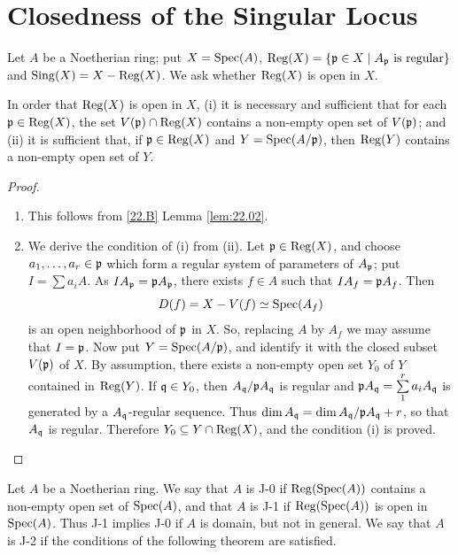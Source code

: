 \documentclass[../main]{subfiles}
\begin{document}
\section{Closedness of the Singular Locus}\label{sec:32}

\newparagraph Let $A$ be a Noetherian ring; put $X = \operatorname{Spec}(A)$, $\operatorname{Reg}(X) = \{\mathfrak{p} \in X \mid A_{\mathfrak{p}} \text { is regular}\}$ and $\operatorname{Sing}(X) = X - \operatorname{Reg}(X)$. We ask whether $\operatorname{Reg}(X)$ is open in $X$. 

\begin{lemma}
\label{lem:32.1}
In order that $\operatorname{Reg}(X)$ is open in $X$, (i) it is necessary and sufficient that for each $\mathfrak{p} \in \operatorname{Reg}(X)$, the set $V(\mathfrak{p}) \cap \operatorname{Reg}(X)$ contains a non-empty open set of $V(\mathfrak{p})$; and (ii) it is sufficient that, if $\mathfrak{p} \in \operatorname{Reg}(X)$ and $Y = \operatorname{Spec}(A/\mathfrak{p})$, then $\operatorname{Reg}(Y)$ contains a non-empty open set of $Y$. 
\end{lemma}

\begin{proof}
\begin{enumerate}
    \item This follows from \ref{22.B} Lemma \ref{lem:22.02}. 
    \item We derive the condition of (i) from (ii). Let $\mathfrak{p} \in \operatorname{Reg}(X)$, and choose $a_1, \dots, a_r \in \mathfrak{p}$ which form a regular system of parameters of $A_{\mathfrak{p}}$; put $I = \sum a_i A$. As $I A_{\mathfrak{p}} = \mathfrak{p} A_{\mathfrak{p}}$, there exists $f \in A$ such that $I A_f = \mathfrak{p} A_f$. Then \[D(f) = X - V(f) \simeq \operatorname{Spec}(A_f)\] is an open neighborhood of $\mathfrak{p}$ in $X$. So, replacing $A$ by $A_f$ we may assume that $I = \mathfrak{p}$. Now put $Y = \operatorname{Spec}(A/\mathfrak{p})$, and identify it with the closed subset $V(\mathfrak{p})$ of $X$. By assumption, there exists a non-empty open set $Y_0$ of $Y$ contained in $\operatorname{Reg}(Y)$. If $\mathfrak{q} \in Y_0$, then $A_{\mathfrak{q}}/\mathfrak{p} A_{\mathfrak{q}}$ is regular and $\mathfrak{p} A_{\mathfrak{q}} = \sum\limits_1^r a_i A_{\mathfrak{q}}$ is generated by a $A_{\mathfrak{q}}$-regular sequence. Thus $\operatorname{dim} A_{\mathfrak{q}} = \operatorname{dim} A_{\mathfrak{q}}/\mathfrak{p} A_{\mathfrak{q}} + r$, so that $A_{\mathfrak{q}}$ is regular. Therefore $Y_0 \subseteq Y \cap \operatorname{Reg}(X)$, and the condition (i) is proved. 
\end{enumerate}
\end{proof}

\newparagraph Let $A$ be a Noetherian ring. We say that $A$ is J-0 if $\operatorname{Reg}(\operatorname{Spec}(A))$ contains a non-empty open set of $\operatorname{Spec}(A)$, and that $A$ is J-1 if $\operatorname{Reg}(\operatorname{Spec}(A))$ is open in $\operatorname{Spec}(A)$. Thus J-1 implies J-0 if $A$ is domain, but not in general. We say that $A$ is J-2 if the conditions of the following theorem are satisfied.
\end{document}
